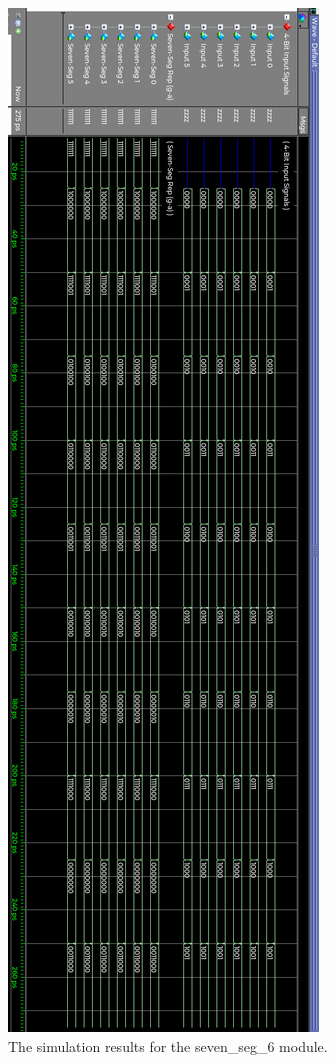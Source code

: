 \documentclass[a4paper]{article}
\begin{document}
\begin{figure}[h]
\centering
\includegraphics[width=.98\textwidth]{functional_units/seven_seg_6/seven_seg_6_sim.png}
\caption{The simulation results for the seven\_seg\_6 module.}
\end{figure}
\clearpage
\end{document}
